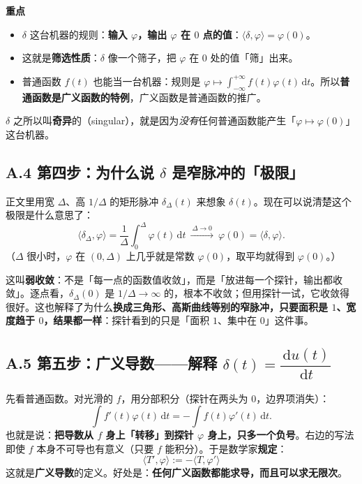 \documentclass[UTF8,a4paper,11pt]{ctexart}
\newenvironment{remember}{\begin{rememberbox}\textbf{重点}\par\smallskip}{\end{rememberbox}}
\renewcommand{\d}{\,\mathrm{d}}
\newcounter{ex}[section]
\begin{document}
\begin{remember}
\begin{itemize}[nosep]
\item $\delta$ 这台机器的规则：\textbf{输入 $\varphi$，输出 $\varphi$ 在 $0$ 点的值}：$\langle\delta,\varphi\rangle=\varphi(0)$。
\item 这就是\textbf{筛选性质}：$\delta$ 像一个筛子，把 $\varphi$ 在 $0$ 处的值「筛」出来。
\item 普通函数 $f(t)$ 也能当一台机器：规则是 $\varphi\mapsto\int_{-\infty}^{+\infty}f(t)\varphi(t)\d t$。所以\textbf{普通函数是广义函数的特例}，广义函数是普通函数的推广。
\end{itemize}
\end{remember}
$\delta$ 之所以叫\textbf{奇异}的（singular），就是因为\emph{没有}任何普通函数能产生「$\varphi\mapsto\varphi(0)$」这台机器。

\subsection*{A.4 第四步：为什么说 $\delta$ 是窄脉冲的「极限」}
正文里用宽 $\Delta$、高 $1/\Delta$ 的矩形脉冲 $\delta_\Delta(t)$ 来想象 $\delta(t)$。现在可以说清楚这个极限是什么意思了：
\[
\langle\delta_\Delta,\varphi\rangle=\frac{1}{\Delta}\int_0^{\Delta}\varphi(t)\d t
\ \xrightarrow{\ \Delta\to0\ }\ \varphi(0)=\langle\delta,\varphi\rangle .
\]
（$\Delta$ 很小时，$\varphi$ 在 $(0,\Delta)$ 上几乎就是常数 $\varphi(0)$，取平均就得到 $\varphi(0)$。）

这叫\textbf{弱收敛}：不是「每一点的函数值收敛」，而是「放进每一个探针，输出都收敛」。逐点看，$\delta_\Delta(0)$ 是 $1/\Delta\to\infty$ 的，根本不收敛；但用探针一试，它收敛得很好。这也解释了为什么\textbf{换成三角形、高斯曲线等别的窄脉冲，只要面积是 $1$、宽度趋于 $0$，结果都一样}：探针看到的只是「面积 $1$、集中在 $0$」这件事。

\subsection*{A.5 第五步：广义导数——解释 $\delta(t)=\dfrac{\d u(t)}{\d t}$}
先看普通函数。对光滑的 $f$，用分部积分（探针在两头为 $0$，边界项消失）：
\[
\int f'(t)\varphi(t)\d t=-\int f(t)\varphi'(t)\d t .
\]
也就是说：\textbf{把导数从 $f$ 身上「转移」到探针 $\varphi$ 身上，只多一个负号}。右边的写法即使 $f$ 本身不可导也有意义（只要 $f$ 能积分）。于是数学家\textbf{规定}：
\[
\langle T',\varphi\rangle:=-\langle T,\varphi'\rangle
\]
这就是\textbf{广义导数}的定义。好处是：\textbf{任何广义函数都能求导，而且可以求无限次}。
\end{document}
